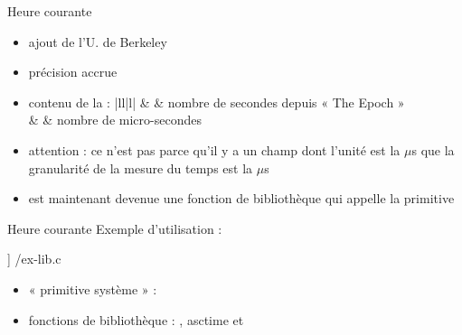 \begin {frame} {Heure courante}

    \begin {itemize}
	\item ajout de l'U. de Berkeley
	\item précision accrue
	\item contenu de la  :
	    \ctableau {\fD} {|ll|l|} {
		 & 
		    & nombre de secondes depuis « The Epoch » \\
		  & 
		    & nombre de micro-secondes \\
	    }

	    \vspace* {1mm}

	\item attention : ce n'est pas parce qu'il y a un champ dont
	    l'unité est la $\mu$s que la granularité de la mesure
	    du temps est la $\mu$s

	\item {} est maintenant devenue une fonction de
	    bibliothèque qui appelle la primitive 

    \end {itemize}
\end {frame}

\begin {frame} {Heure courante}
    Exemple d'utilisation :

    \fD\lstmonstyle] {\inc/ex-lib.c}

    \begin {itemize}
	\item « primitive système » : 
	\item fonctions de bibliothèque : , \code
	    {asctime} et 
    \end {itemize}
\end {frame}



